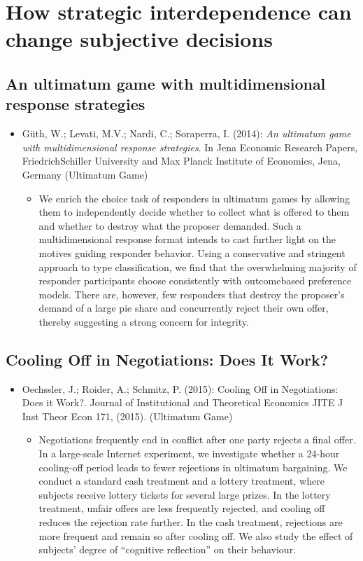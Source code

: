 
\chapter{How strategic interdependence can change subjective decisions}

\section{An ultimatum game with multidimensional response strategies} 

\begin{itemize}
	\item Güth, W.; Levati, M.V.; Nardi, C.; Soraperra, I. (2014): \textit{An ultimatum game with multidimensional response strategies}. In Jena Economic Research Papers, FriedrichSchiller University and Max Planck Institute of Economics, Jena, Germany (Ultimatum Game)
		\begin{itemize}
			\item We enrich the choice task of responders in ultimatum games by allowing them to independently decide whether to collect what is offered to them and whether to destroy what the proposer demanded. Such a multidimensional response format intends to cast further light on the motives guiding responder behavior. Using a conservative and stringent approach to type classification, we find that the overwhelming majority of responder participants choose consistently with outcomebased preference models. There are, however, few responders that destroy the proposer's demand of a large pie share and concurrently reject their own offer, thereby suggesting a strong concern for integrity.
		\end{itemize}
\end{itemize}
\vspace{-0.5cm}
\section{Cooling Off in Negotiations: Does It Work?}

\begin{itemize}
	\item Oechssler, J.; Roider, A.; Schmitz, P. (2015): Cooling Off in Negotiations: Does it Work?. Journal of Institutional and Theoretical Economics JITE J Inst Theor Econ 171, (2015). (Ultimatum Game)
		\begin{itemize}
			\item Negotiations frequently end in conflict after one party rejects a final offer. In a large-scale Internet experiment, we investigate whether a 24-hour cooling-off period leads to fewer rejections in ultimatum bargaining. We conduct a standard cash treatment and a lottery treatment, where subjects receive lottery tickets for several large prizes. In the lottery treatment, unfair offers are less frequently rejected, and cooling off reduces the rejection rate further. In the cash treatment, rejections are more frequent and remain so after cooling off. We also study the effect of subjects’ degree of “cognitive reflection” on their behaviour.
		\end{itemize}
\end{itemize}